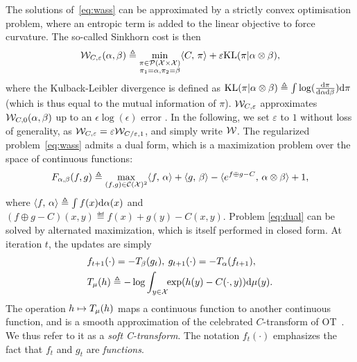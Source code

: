 The solutions of~\eqref{eq:wass} can be approximated by a strictly convex optimisation problem, where an entropic term is added to the linear objective to force curvature. The so-called Sinkhorn cost is then
\begin{equation}\label{eq:wass}
    \mathcal{W}_{C,\varepsilon}(\alpha, \beta) \triangleq 
    \min_{
    \substack{
        \pi \in \mathcal{P}(\mathcal{X} \times \mathcal{X})
        \\\pi_1 = \alpha, \pi_2 = \beta
    }    
    } \langle C,\,\pi\rangle + \varepsilon \textrm{KL}(\pi | \alpha \otimes \beta),
\end{equation}
where the Kulback-Leibler divergence is defined as $\textrm{KL}(\pi | \alpha \otimes
\beta) \triangleq \int \log(\frac{\textrm{d}\pi}{\textrm{d}\alpha\textrm{d}\beta}) \textrm{d}\pi$ (which is thus equal to
the mutual information of $\pi$).
%
$\mathcal{W}_{C,\varepsilon}$ approximates $\mathcal{W}_{C,0}(\alpha,\beta)$ up to an $\epsilon
\log(\epsilon)$ error \citep{2019-Genevay-aistats}. In the following, we set
$\varepsilon$ to $1$ without loss of generality, as $\mathcal{W}_{C, \varepsilon} =
\varepsilon \mathcal{W}_{C / \varepsilon, 1}$, and simply write $\mathcal{W}$.
%
The regularized problem~\eqref{eq:wass} admits a dual form, which is a maximization problem over the space of continuous functions:
\begin{equation}\label{eq:dual}
    F_{\alpha, \beta}(f, g) \triangleq \max_{(f, g) \in \mathcal{C}(\mathcal{X})^2} \langle f,\,\alpha\rangle + 
    \langle g,\,\beta\rangle
    - \langle e^{f \oplus g - C},\,\alpha \otimes \beta\rangle + 1, 
\end{equation}
where $\langle f,\,\alpha\rangle \triangleq \int f(x) \textrm{d}\alpha(x)$ and $(f \oplus g - C)(x,y)
\eqdef f(x)+g(y)-C(x,y)$.
Problem \eqref{eq:dual} can be solved by alternated maximization, which is itself performed in closed form. At iteration $t$, the updates are simply
\begin{align}
    &f_{t+1}(\cdot) = - T_{\beta}(g_t), \:
    g_{t+1}(\cdot) = - T_{\alpha}(f_{t+1}), \\
    &
    T_{\mu}(h) \triangleq 
    - \log \int_{y \in \mathcal{X}}\!\! \exp(h(y) - C(\cdot, y))\textrm{d} \mu(y).\label{eq:sinkhorn}
\end{align}
The operation $h \mapsto T_{\mu}(h)$  maps a continuous function to another
continuous function, and is a smooth approximation of the celebrated
$C$-transform of OT~\citep{santambrogio2015optimal}. We thus refer to it as a
\textit{soft C-transform}. 
%
The notation $f_t(\cdot)$ emphasizes the fact that $f_t$ and $g_t$ are
\textit{functions}. 
%

